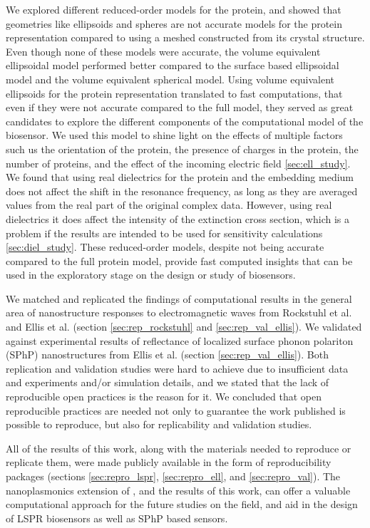 We explored different reduced-order models for the protein, and showed that geometries like ellipsoids and spheres
are not accurate models for the protein representation compared to using a meshed constructed from its crystal structure. Even though
none of these models were accurate, the volume equivalent ellipsoidal model performed better compared to the surface based ellipsoidal 
model and the volume equivalent spherical model. Using volume equivalent ellipsoids for the protein representation 
translated to fast computations, that even if they were not accurate compared to the full model, they served as great candidates to
explore the different components of the computational model of the biosensor. We used this model to shine light on the effects of multiple factors such us 
the orientation of the protein, the presence of charges in the protein, the number of proteins, and the effect of the incoming electric field \ref{sec:ell_study}.
We found that using real dielectrics for the protein and the embedding medium does not affect the shift in the resonance frequency, 
as long as they are averaged values from the real part of the original complex data. However, using real dielectrics it does affect the 
intensity of the extinction cross section, which is a problem if the results are intended to be used for sensitivity calculations \ref{sec:diel_study}. 
These reduced-order models, despite not being accurate compared to the full protein model, provide fast computed insights that can be used 
in the exploratory stage on the design or study of biosensors.

We matched and replicated the findings of computational results in the general area of nanostructure responses to electromagnetic waves 
from Rockstuhl et al. \cite{rockstuhl2005} and Ellis et al.\cite{ellis2016} (section \ref{sec:rep_rockstuhl} and \ref{sec:rep_val_ellis}). We validated
\pygbe against experimental results of reflectance of localized surface phonon polariton (SPhP) nanostructures from Ellis et 
al. (section \ref{sec:rep_val_ellis}). Both replication and validation studies were hard to achieve due to insufficient data and experiments 
and/or simulation details, and we stated that the lack of reproducible open practices is the reason for it. We concluded that open reproducible 
practices are needed not only to guarantee the work published is possible to reproduce, but also for replicability and validation studies. 

All of the results of this work, along with the materials needed to reproduce or replicate them, were made publicly available in the form of 
reproducibility packages (sections \ref{sec:repro_lspr}, \ref{sec:repro_ell}, and \ref{sec:repro_val}). The nanoplasmonics extension of \pygbe, and 
the results of this work, can offer a valuable computational approach for the future studies on the field, and aid in the design of LSPR biosensors 
as well as SPhP based sensors. 


